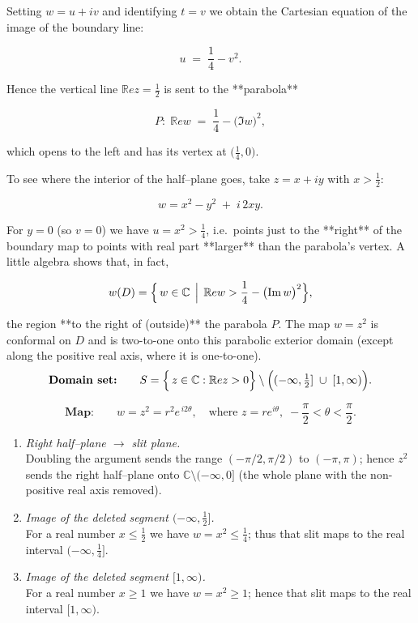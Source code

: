 \documentclass[12pt]{article}
\theoremstyle{definition} %
\theoremstyle{plain} %
\begin{document}
  Setting \(w=u+iv\) and identifying \(t=v\) we obtain the Cartesian equation of the image of the boundary line:
  
  \[
  u \;=\; \frac14 - v^{2}.
  \]
  
  Hence the vertical line \(\mathbb{R}e z=\tfrac12\) is sent to the **parabola**
  
  \[
  \boxed{P:\; \mathbb{R}e w \;=\; \frac14-\bigl(\Im w\bigr)^{2}},
  \]
  
  which opens to the left and has its vertex at \(\bigl(\tfrac14,0\bigr)\).
  
  \vspace{1em}
  
  To see where the interior of the half–plane goes, take \(z=x+iy\) with \(x>\tfrac12\):
  
  \[
  w = x^{2}-y^{2} \;+\; i\,2xy .
  \]
  
  For \(y=0\) (so \(v=0\)) we have \(u=x^{2}>\tfrac14\), i.e.\ points just to the **right** of the boundary map to points with real part **larger** than the parabola’s vertex.  
  A little algebra shows that, in fact,
  
  \[
  w(D)=\Bigl\{\,w\in\mathbb{C}\,\Bigm|\,
            \mathbb{R}e w>\frac14-\bigl(\Im w\bigr)^{2}\Bigr\},
  \]
  
  the region **to the right of (outside)** the parabola \(P\).  
  The map \(w=z^{2}\) is conformal on \(D\) and is two-to-one onto this parabolic exterior domain (except along the positive real axis, where it is one-to-one).
  \pagebreak
\[
  \textbf{Domain set:}\qquad
  S=\Bigl\{\,z\in\mathbb{C} : \mathbb{R}e z>0\Bigr\}\setminus\Bigl((-\infty,\tfrac12]\;\cup\;[1,\infty)\Bigr).
  \]
  
  \[
  \textbf{Map:}\qquad w=z^{2}=r^{2}e^{\,i2\theta},
  \quad\text{where } z=re^{i\theta},\;
  -\frac{\pi}{2}<\theta<\frac{\pi}{2}.
  \]
  
  \begin{enumerate}
      \item \emph{Right half–plane \(\to\) slit plane.}\\
            Doubling the argument sends the range \((-\pi/2,\pi/2)\) to \((-\pi,\pi)\);
            hence \(z^{2}\) sends the right half–plane onto
            \(\mathbb{C}\setminus(-\infty,0]\) (the whole plane with the non-positive
            real axis removed).
  
      \item \emph{Image of the deleted segment \((-\infty,\frac12]\).}\\
            For a real number \(x\le\frac12\) we have \(w=x^{2}\le\frac14\);
            thus that slit maps to the real interval
            \((-\infty,\tfrac14]\).
  
      \item \emph{Image of the deleted segment \([1,\infty)\).}\\
            For a real number \(x\ge1\) we have \(w=x^{2}\ge1\);
            hence that slit maps to the real interval
            \([1,\infty)\).
  \end{enumerate}
  
\end{document}

